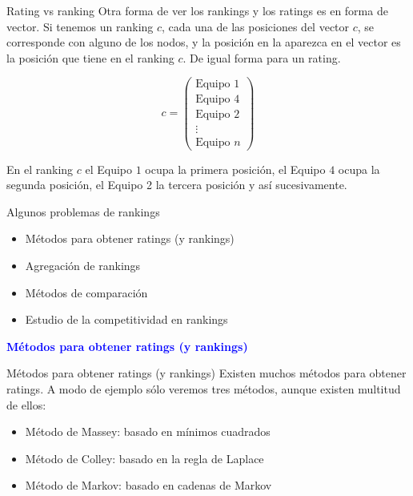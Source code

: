 \documentclass[10pt,hyperref={unicode}]{beamer}
\begin{document}
	
	\begin{frame}{Rating vs ranking}
		Otra forma de ver los rankings y los ratings es en forma de vector. Si tenemos un ranking $c$, cada una de las posiciones del vector $c$, se corresponde con alguno de los nodos, y la posición en la aparezca en el vector es la posición que tiene en el ranking $c$. De igual forma para un rating.
		
		\begin{ejemplo}
			$$ c = \left(
			\begin{array}{c}
			\text{Equipo } 1 \\
			\text{Equipo } 4 \\
			\text{Equipo } 2 \\
			\vdots \\
			\text{Equipo } n
			\end{array}
			\right) $$
				
			En el ranking $c$ el Equipo $1$ ocupa la primera posición, el Equipo $4$ ocupa la segunda posición, el Equipo 2 la tercera posición y así sucesivamente.
			
		\end{ejemplo}
	\end{frame}
	
	\begin{frame}{Algunos problemas de rankings}
			\begin{itemize}
			\item Métodos para obtener ratings (y rankings)
			\item Agregación de rankings
			\item Métodos de comparación
			\item Estudio de la competitividad en rankings
			\end{itemize}
		\end{frame}
	
	
	\begin{frame}
			\begin{center}
				\Huge\textbf{\textsf{\textcolor{blue}{Métodos para obtener ratings (y rankings)}}}
			\end{center}
		\end{frame}
		
		\begin{frame}{Métodos para obtener ratings (y rankings)}
				Existen muchos métodos para obtener ratings. A modo de ejemplo sólo veremos tres métodos, aunque existen multitud de ellos:
				
				\begin{itemize}
					\item Método de Massey: basado en mínimos cuadrados
					\item Método de Colley: basado en la regla de Laplace
					\item Método de Markov: basado en cadenas de Markov
				\end{itemize}
			\end{frame}
	
\end{document}
